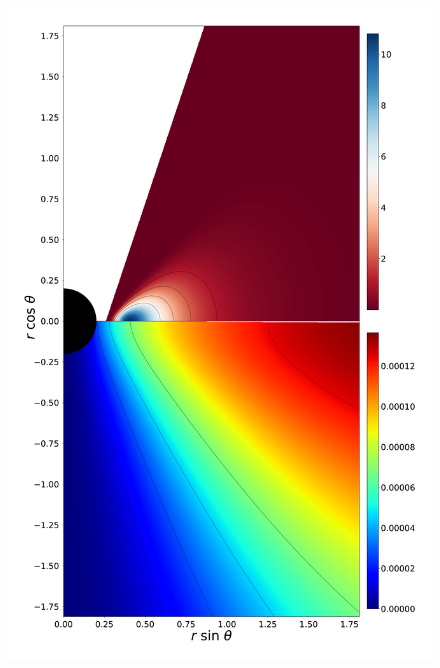 \documentclass[twocolumn,aps,showpacs,showkeys,prd,superscriptaddress,byrevtex, amsmath]{revtex4-1}
\begin{document}
\begin{figure}
\includegraphics[scale=0.12]{figures/fig5_I__10.pdf}
\hspace{-0.3cm}

\end{figure}
\end{document}
